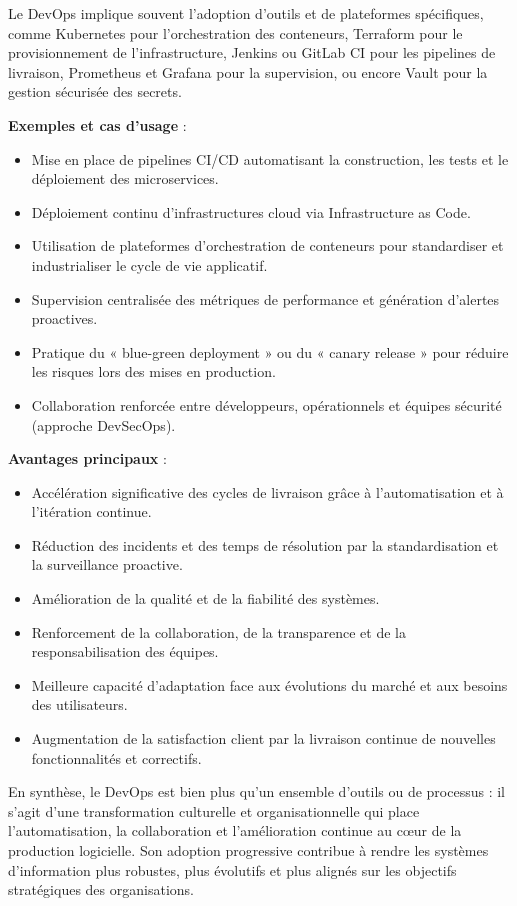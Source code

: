 Le DevOps implique souvent l’adoption d’outils et de plateformes spécifiques, comme Kubernetes pour l’orchestration des conteneurs, Terraform pour le provisionnement de l’infrastructure, Jenkins ou GitLab CI pour les pipelines de livraison, Prometheus et Grafana pour la supervision, ou encore Vault pour la gestion sécurisée des secrets.

\textbf{Exemples et cas d’usage} :
\begin{itemize}
	\item Mise en place de pipelines CI/CD automatisant la construction, les tests et le déploiement des microservices.
	\item Déploiement continu d’infrastructures cloud via Infrastructure as Code.
	\item Utilisation de plateformes d’orchestration de conteneurs pour standardiser et industrialiser le cycle de vie applicatif.
	\item Supervision centralisée des métriques de performance et génération d’alertes proactives.
	\item Pratique du « blue-green deployment » ou du « canary release » pour réduire les risques lors des mises en production.
	\item Collaboration renforcée entre développeurs, opérationnels et équipes sécurité (approche DevSecOps).
\end{itemize}

\textbf{Avantages principaux} :
\begin{itemize}
	\item Accélération significative des cycles de livraison grâce à l’automatisation et à l’itération continue.
	\item Réduction des incidents et des temps de résolution par la standardisation et la surveillance proactive.
	\item Amélioration de la qualité et de la fiabilité des systèmes.
	\item Renforcement de la collaboration, de la transparence et de la responsabilisation des équipes.
	\item Meilleure capacité d’adaptation face aux évolutions du marché et aux besoins des utilisateurs.
	\item Augmentation de la satisfaction client par la livraison continue de nouvelles fonctionnalités et correctifs.
\end{itemize}

En synthèse, le DevOps est bien plus qu’un ensemble d’outils ou de processus : il s’agit d’une transformation culturelle et organisationnelle qui place l’automatisation, la collaboration et l’amélioration continue au cœur de la production logicielle. Son adoption progressive contribue à rendre les systèmes d’information plus robustes, plus évolutifs et plus alignés sur les objectifs stratégiques des organisations.

